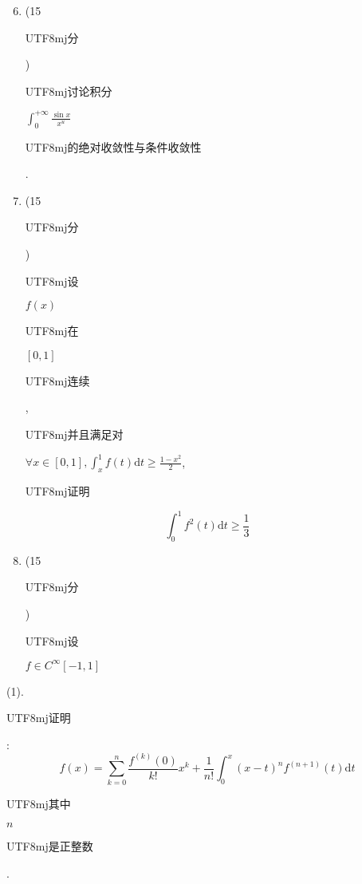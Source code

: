 \documentclass[10pt]{article}
\begin{document}
\begin{enumerate}
  \setcounter{enumi}{5}
  \item (15 \begin{CJK}{UTF8}{mj}分\end{CJK}) \begin{CJK}{UTF8}{mj}讨论积分\end{CJK} $\int_{0}^{+\infty} \frac{\sin x}{x^{u}}$ \begin{CJK}{UTF8}{mj}的绝对收敛性与条件收敛性\end{CJK}.

  \item (15 \begin{CJK}{UTF8}{mj}分\end{CJK}) \begin{CJK}{UTF8}{mj}设\end{CJK} $f(x)$ \begin{CJK}{UTF8}{mj}在\end{CJK} $[0,1]$ \begin{CJK}{UTF8}{mj}连续\end{CJK}, \begin{CJK}{UTF8}{mj}并且满足对\end{CJK} $\forall x \in[0,1], \int_{x}^{1} f(t) \mathrm{d} t \geq \frac{1-x^{2}}{2}$, \begin{CJK}{UTF8}{mj}证明\end{CJK}

\end{enumerate}
$$
\int_{0}^{1} f^{2}(t) \mathrm{d} t \geq \frac{1}{3}
$$

\begin{enumerate}
  \setcounter{enumi}{7}
  \item (15 \begin{CJK}{UTF8}{mj}分\end{CJK}) \begin{CJK}{UTF8}{mj}设\end{CJK} $f \in C^{\infty}[-1,1]$
\end{enumerate}
(1). \begin{CJK}{UTF8}{mj}证明\end{CJK}:
$$
f(x)=\sum_{k=0}^{n} \frac{f^{(k)}(0)}{k !} x^{k}+\frac{1}{n !} \int_{0}^{x}(x-t)^{n} f^{(n+1)}(t) \mathrm{d} t
$$
\begin{CJK}{UTF8}{mj}其中\end{CJK} $n$ \begin{CJK}{UTF8}{mj}是正整数\end{CJK}.
\end{document}
